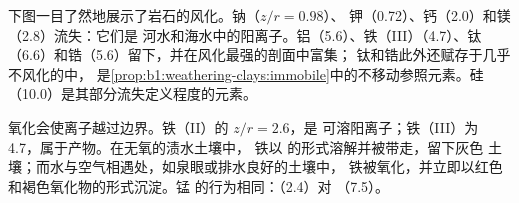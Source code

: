 下图一目了然地展示了岩石的风化。钠（$z/r = 0.98$）、
钾（0.72）、钙（2.0）和镁（2.8）流失：它们是
河水和海水中的阳离子。铝（5.6）、铁（III）（4.7）、钛
（6.6）和锆（5.6）留下，并在风化最强的剖面中富集；
钛和锆此外还赋存于几乎不风化的中，
是\cref{prop:b1:weathering-clays:immobile}中的不移动参照元素。硅
（10.0）是其部分流失定义程度的元素。

氧化会使离子越过边界。铁（II）的 $z/r = 2.6$，是
可溶阳离子；铁（III）为 4.7，属于产物。在无氧的渍水土壤中，
铁以  的形式溶解并被带走，留下灰色
土壤；而水与空气相遇处，如泉眼或排水良好的土壤中，
铁被氧化，并立即以红色和褐色氧化物的形式沉淀。锰
的行为相同：（2.4）对 （7.5）。

